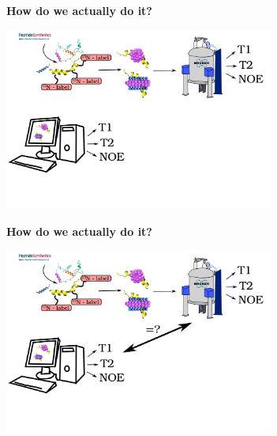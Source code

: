 \documentclass{beamer}
\begin{document}
\addtocounter{framenumber}{-1}
\begin{frame}
\begin{center}
\Large{\centering
\textbf{How do we actually do it?} \\}

\vspace{0.5cm}

\includegraphics[height=6cm]{what_we_do4.pdf}
\end{center}
\end{frame}


\addtocounter{framenumber}{-1}
\begin{frame}
\begin{center}
\Large{\centering
\textbf{How do we actually do it?} \\}

\vspace{0.5cm}

\includegraphics[height=6cm]{what_we_do3.pdf}
\end{center}
\end{frame}
\end{document}
